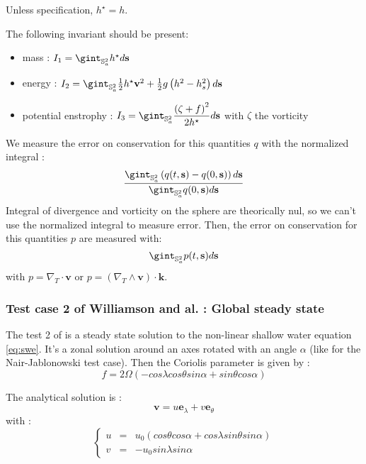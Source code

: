 Unless specification, $h^{\star} = h$.

The following invariant should be present:
\begin{itemize}
\item mass : $I_1=\gint_{\mathbb{S}_a^2} h^{\star}d\mathbf{s}$ \\

\item energy : $I_2 = \gint_{\mathbb{S}_a^2} \frac{1}{2} h^{\star} \mathbf{v}^2 + \frac{1}{2}g \left( h^2 - h_s^2 \right) d\mathbf{s}$ \\

\item potential enstrophy : $I_{3}=\gint_{\mathbb{S}_a^2} \dfrac{\left( \zeta + f \right)^2}{2 h^{\star}} d\mathbf{s}$ with $\zeta$ the vorticity\\
\end{itemize}
We measure the error on conservation for this quantities $q$ with the normalized integral :
\begin{equation}
\dfrac{\gint_{\mathbb{S}_a^2} \left( q(t,\mathbf{s})-q(0,\mathbf{s}) \right) d \mathbf{s}}{\gint_{\mathbb{S}_a^2} q(0,\mathbf{s})d \mathbf{s}}
\end{equation}
Integral of divergence and vorticity on the sphere are theorically nul, so we can't use the normalized integral to measure error. Then, the error on conservation for this quantities $p$ are measured with:
\begin{equation}
\gint_{\mathbb{S}_a^2} p(t,\mathbf{s})d \mathbf{s}
\end{equation}
with $p = \nabla_T \cdot \mathbf{v}$ or $p = \left( \nabla_T \wedge \mathbf{v}  \right) \cdot \mathbf{k}$.

\subsubsection{Test case 2 of Williamson and al. : Global steady state}

The test 2 of \cite{Williamson-Drake-Hack-Jakob-Swarztrauber} is a steady state solution to the non-linear shallow water equation \eqref{eq:swe}. It's a zonal solution around an axes rotated with an angle $\alpha$ (like for the Nair-Jablonowski test case).
Then the Coriolis parameter is given by :
\begin{equation}
f=2 \Omega \left( - cos \lambda cos \theta sin \alpha + sin \theta cos \alpha \right)
\end{equation}

The analytical solution is :
\begin{equation}
\mathbf{v} = u \mathbf{e}_{\lambda} + v \mathbf{e}_{\theta}
\end{equation}
with :
\begin{equation}
\left\lbrace
\begin{array}{rcl}
u & = & u_0 \left( cos \theta cos \alpha + cos \lambda sin \theta sin \alpha \right)\\
v & = & -u_0 sin \lambda sin \alpha
\end{array}
\label{eq:W2 velocity}
\right.
\end{equation}

